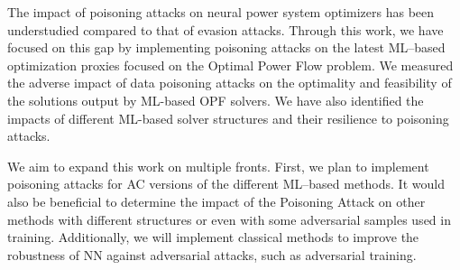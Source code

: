
The impact of poisoning attacks on neural power system optimizers has been understudied compared to that of evasion attacks. Through this work, we have focused on this gap by implementing poisoning attacks on the latest ML--based optimization proxies focused on the Optimal Power Flow problem. We measured the adverse impact of data poisoning attacks on the optimality and feasibility of the solutions output by ML-based OPF solvers. We have also identified the impacts of different ML-based solver structures and their resilience to poisoning attacks.

We aim to expand this work on multiple fronts. First, we plan to implement poisoning attacks for AC versions of the different ML--based methods. It would also be beneficial to determine the impact of the Poisoning Attack on other methods with different structures or even with some adversarial samples used in training. Additionally, we will implement classical methods to improve the robustness of NN against adversarial attacks, such as adversarial training. %